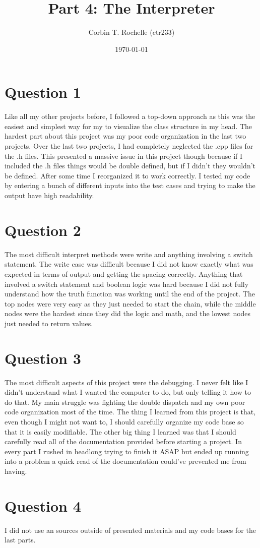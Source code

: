 \documentclass{article}
\author{Corbin T. Rochelle (ctr233)}
\title{Part 4: The Interpreter}
\date{\today}
\begin{document}
\maketitle

\section*{Question 1}
Like all my other projects before, I followed a top-down approach as this was the easiest and simplest way for my to visualize the class structure in my head. 
The hardest part about this project was my poor code organization in the last two projects. 
Over the last two projects, I had completely neglected the .cpp files for the .h files. 
This presented a massive issue in this project though because if I included the .h files things would be double defined, but if I didn't they wouldn't be defined.
After some time I reorganized it to work correctly.
I tested my code by entering a bunch of different inputs into the test cases and trying to make the output have high readability. 

\section*{Question 2}
The most difficult interpret methods were write and anything involving a switch statement. 
The write case was difficult because I did not know exactly what was expected in terms of output and getting the spacing correctly.
Anything that involved a switch statement and boolean logic was hard because I did not fully understand how the truth function was working until the end of the project.
The top nodes were very easy as they just needed to start the chain, while the middle nodes were the hardest since they did the logic and math, and the lowest nodes just needed to return values.

\section*{Question 3} 
The most difficult aspects of this project were the debugging.
I never felt like I didn't understand what I wanted the computer to do, but only telling it how to do that.
My main struggle was fighting the double dispatch and my own poor code organization most of the time. 
The thing I learned from this project is that, even though I might not want to, I should carefully organize my code base so that it is easily modifiable.
The other big thing I learned was that I should carefully read all of the documentation provided before starting a project.
In every part I rushed in headlong trying to finish it ASAP but ended up running into a problem a quick read of the documentation could've prevented me from having. 

\section*{Question 4} 
I did not use an sources outside of presented materials and my code bases for the last parts. 
\end{document}
